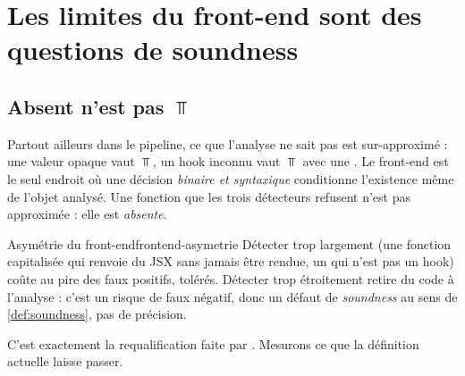 \section{Les limites du front-end sont des questions de soundness}
\label{sec:frontend-limites}

\subsection{Absent n'est pas $\Top$}

Partout ailleurs dans le pipeline, ce que l'analyse ne sait pas est sur-approximé : une valeur opaque vaut $\Top$, un hook inconnu vaut $\Top$ avec une \Info{}. Le front-end est le seul endroit où une décision \emph{binaire et syntaxique} conditionne l'existence même de l'objet analysé. Une fonction que les trois détecteurs refusent n'est pas approximée : elle est \emph{absente}.

\begin{invariant}{Asymétrie du front-end}{frontend-asymetrie}
Détecter trop largement (une fonction capitalisée qui renvoie du JSX sans jamais être rendue, un  qui n'est pas un hook) coûte au pire des faux positifs, tolérés. Détecter trop étroitement retire du code à l'analyse : c'est un risque de faux négatif, donc un défaut de \emph{soundness} au sens de \cref{def:soundness}, pas de précision.
\end{invariant}

C'est exactement la requalification faite par . Mesurons ce que la définition actuelle laisse passer.


